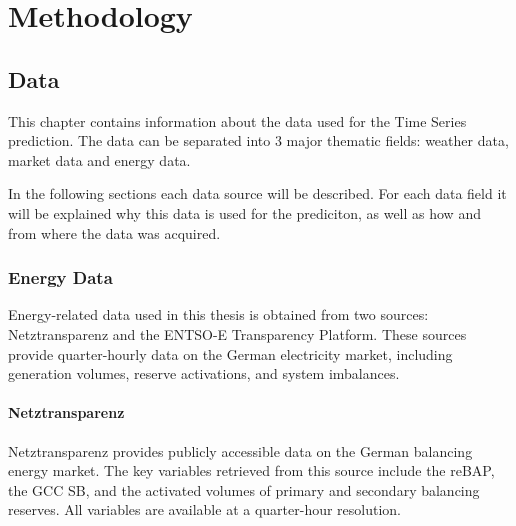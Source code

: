 \documentclass[class=scrbook, crop=false]{standalone}
\begin{document}
\chapter{Methodology} %
\label{Chapter::Methodology}

\section{Data}
\label{Chapter::Data}
This chapter contains information about the data used for the Time Series prediction. 
The data can be separated into 3 major thematic fields: weather data, market data and energy data.

In the following sections each data source will be described. 
For each data field it will be explained why this data is used for the prediciton, as well as  how and from where the data was acquired.



\subsection{Energy Data}
\label{Section::Energy_Data}

Energy-related data used in this thesis is obtained from two sources: Netztransparenz and the \gls{ENTSO-E} Transparency Platform. 
These sources provide quarter-hourly data on the German electricity market, including generation volumes, reserve activations, and system imbalances.
\subsubsection{Netztransparenz}

Netztransparenz provides publicly accessible data on the German balancing energy market. The key variables retrieved from this source include the \gls{reBAP}, the \gls{GCC} \gls{SB}, and the activated volumes of primary and secondary balancing reserves. All variables are available at a quarter-hour resolution.
\end{document}
